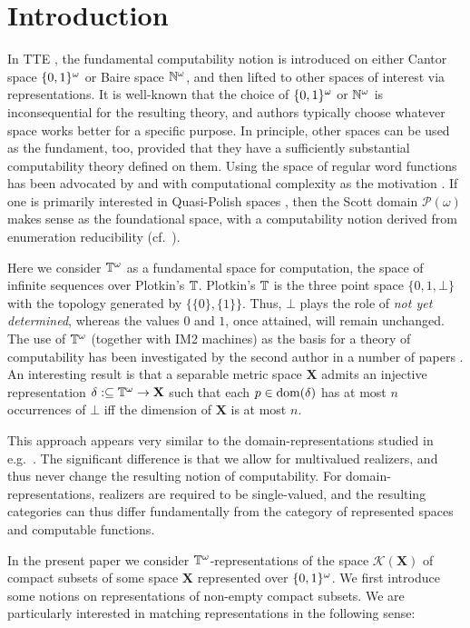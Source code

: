 \documentclass{eptcs-modified}
\begin{document}
\section{Introduction}
In TTE \cite{weihrauchd}, the fundamental computability notion is introduced on either Cantor space ${\{0,1\}^\omega}$ or Baire space ${\mathbb{N}^\omega}$, and then lifted to other spaces of interest via representations. It is well-known that the choice of ${\{0,1\}^\omega}$ or ${\mathbb{N}^\omega}$ is inconsequential for the resulting theory, and authors typically choose whatever space works better for a specific purpose. In principle, other spaces can be used as the fundament, too, provided that they have a sufficiently substantial computability theory defined on them. Using the space of regular word functions has been advocated by  and  with computational complexity as the motivation \cite{kawamura}. If one is primarily interested in Quasi-Polish spaces \cite{debrecht6}, then the Scott domain $\mathcal{P}(\omega)$ makes sense as the foundational space, with a computability notion derived from enumeration reducibility (cf.~\cite{pauly-kihara-arxiv}).

Here we consider $\mathbb{T}^\omega$ as a fundamental space for computation, the space of infinite sequences over Plotkin's $\mathbb{T}$. Plotkin's $\mathbb{T}$ is the three point space $\{0,1,\bot\}$ with the topology generated by $\{\{0\},\{1\}\}$. Thus, $\bot$ plays the role of \emph{not yet determined}, whereas the values $0$ and $1$, once attained, will remain unchanged. The use of $\mathbb{T}^\omega$ (together with IM2 machines) as the basis for a theory of computability has been investigated by the second author in a number of papers \cite{tsuiki,tsuiki4,tsuiki3}. An interesting result is that a separable
metric space $\mathbf{X}$ admits an injective representation $\delta : \subseteq \mathbb{T}^\omega \to \mathbf{X}$ such that each $p \in \operatorname{dom}(\delta)$ has at most $n$ occurrences of $\bot$ iff the dimension of $\mathbf{X}$ is at most $n$.

This approach appears very similar to the domain-representations studied in e.g.~\cite{blanck}. The significant difference is that we allow for multivalued realizers,
and thus never change the resulting notion of computability. For domain-representations, realizers are required to be single-valued, and the resulting categories can thus differ fundamentally from the category of represented spaces and computable functions.

In the present paper we consider $\mathbb{T}^\omega$-representations of the space $\mathcal{K}(\mathbf{X})$ of compact subsets of some space $\mathbf{X}$ represented over ${\{0,1\}^\omega}$. We first introduce some notions on representations of non-empty compact subsets.
We are particularly interested in matching representations in the following sense:
\end{document}
